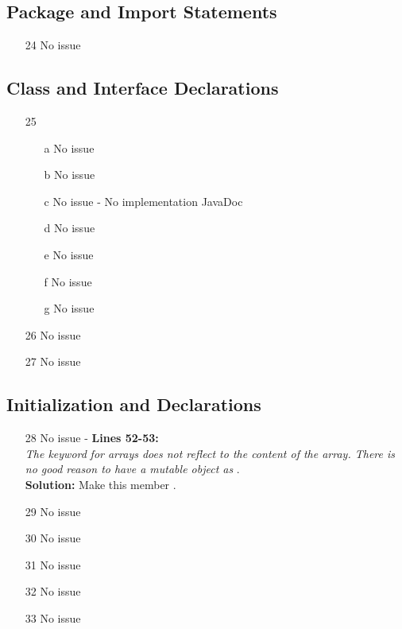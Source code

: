 \subsection{Package and Import Statements}
\begin{itemize}
	\item[24] No issue
\end{itemize}
\subsection{Class and Interface Declarations}

\begin{itemize}
	\item[25]
	\begin{itemize}
		\item[a] No issue
		\item[b] No issue
		\item[c] No issue - No implementation JavaDoc
		\item[d] No issue
		\item[e] No issue 
		\item[f] No issue 
		\item[g] No issue
	\end{itemize}
	\item[26] No issue 
	\item[27] No issue 
\end{itemize}

\subsection{Initialization and Declarations}
\begin{itemize}

\item[28] No issue -  \textbf{Lines 52-53:}\\
	\textit{ The keyword } \textit{for arrays does not reflect to the content of the array. There is no good reason to have a mutable object as} . \\
	\textbf{Solution: }Make this member . 
\item[29] No issue
\item[30] No issue
\item[31] No issue 
\item[32] No issue 
\item[33] No issue 
\end{itemize}

